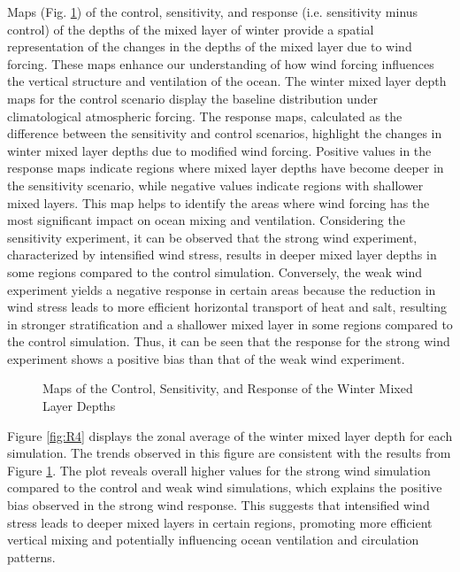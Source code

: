 \documentclass[12pt]{article}
\begin{document}
\noindent Maps (Fig. \ref{fig:R3}) of the control, sensitivity, and response (i.e. sensitivity minus control) of the depths of the mixed layer of winter provide a spatial representation of the changes in the depths of the mixed layer due to wind forcing. These maps enhance our understanding of how wind forcing influences the vertical structure and ventilation of the ocean. The winter mixed layer depth maps for the control scenario display the baseline distribution under climatological atmospheric forcing. The response maps, calculated as the difference between the sensitivity and control scenarios, highlight the changes in winter mixed layer depths due to modified wind forcing. Positive values in the response maps indicate regions where mixed layer depths have become deeper in the sensitivity scenario, while negative values indicate regions with shallower mixed layers. This map helps to identify the areas where wind forcing has the most significant impact on ocean mixing and ventilation. Considering the sensitivity experiment, it can be observed that the strong wind experiment, characterized by intensified wind stress, results in deeper mixed layer depths in some regions compared to the control simulation.  Conversely, the weak wind experiment yields a negative response in certain areas because the reduction in wind stress leads to more efficient horizontal transport of heat and salt, resulting in stronger stratification and a shallower mixed layer in some regions compared to the control simulation. Thus, it can be seen that the response for the strong wind experiment shows a positive bias than that of the weak wind experiment.

\begin{figure}
    \begin{center}
    \caption{Maps of the Control, Sensitivity, and Response of the Winter Mixed Layer Depths}
    \label{fig:R3}
    \end{center}
\end{figure}

\noindent Figure \ref{fig:R4} displays the zonal average of the winter mixed layer depth for each simulation. The trends observed in this figure are consistent with the results from Figure \ref{fig:R3}. The plot reveals overall higher values for the strong wind simulation compared to the control and weak wind simulations, which explains the positive bias observed in the strong wind response. This suggests that intensified wind stress leads to deeper mixed layers in certain regions, promoting more efficient vertical mixing and potentially influencing ocean ventilation and circulation patterns.
\end{document}
